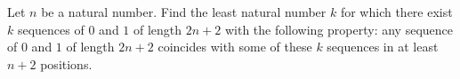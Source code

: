 Let $n$ be a natural number. Find the least natural number $k$ for which there exist $k$ sequences of $0$ and $1$ of length $2n+2$ with the following property: any sequence of $0$ and $1$ of length $2n+2$ coincides with some of these $k$ sequences in at least $n+2$ positions.